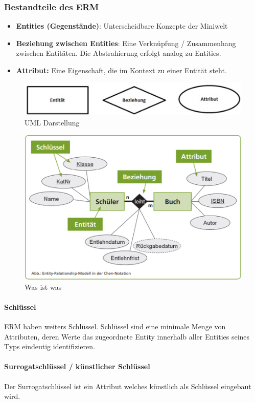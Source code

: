 \subsubsection{Bestandteile des ERM}

\begin{itemize}
    \item \textbf{Entities (Gegenstände)}: Unterscheidbare Konzepte der Miniwelt
    \item \textbf{Beziehung zwischen Entities}: Eine Verknüpfung / Zusammenhang zwischen Entitäten. Die Abstrahierung erfolgt analog zu Entities.
    \item \textbf{Attribut:} Eine Eigenschaft, die im Kontext zu einer Entität steht.
\end{itemize}

\begin{figure}[H]
    \centering
    \includegraphics[width=.5\textwidth]{Content/images/modellierung/erd.png}
    \caption{UML Darstellung}
    \label{fig:modellierung:erd}
\end{figure}
\begin{figure}[H]
    \centering
    \includegraphics[width=.3\textwidth]{Content/images/modellierung/erde.png}
    \caption{Was ist was}
    \label{fig:modellierung:erde}
\end{figure}

\paragraph{Schlüssel}

ERM haben weiters Schlüssel. Schlüssel sind eine minimale Menge von Attributen, deren Werte das zugeordnete Entity innerhalb aller Entities seines Typs eindeutig identifizieren.

\paragraph{Surrogatschlüssel / künstlicher Schlüssel}

Der Surrogatschlüssel ist ein Attribut welches künstlich als Schlüssel eingebaut wird.

